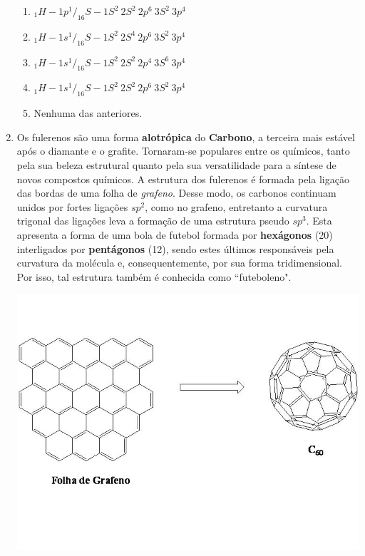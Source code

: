 \documentclass[10pt,a4paper]{article}
\newenvironment{Figure}
  {\par\medskip\noindent\minipage{\linewidth}}
  {\endminipage\par\medskip}
\begin{document}
\begin{multicols}{2}
\begin{enumerate}
		\begin{enumerate}
		\item $ _1H - 1p^1 / _{16}S - 1S^2 \  2S^2 \ 2p^6 \ 3S^2 \ 3p^4$
		\item $ _1H - 1s^1 / _{16}S - 1S^2 \  2S^4 \ 2p^6 \ 3S^2 \ 3p^4$
		\item $ _1H - 1s^1 / _{16}S - 1S^2 \  2S^2 \ 2p^4 \ 3S^6 \ 3p^4$
		\item $ _1H - 1s^1 / _{16}S - 1S^2 \  2S^2 \ 2p^6 \ 3S^2 \ 3p^4$
		\item Nenhuma das anteriores.
		\end{enumerate}

	\item Os fulerenos s\~ao uma forma \textbf{ alotr\'opica} do \textbf{ Carbono}, a terceira mais est\'avel ap\'os o diamante e o grafite. Tornaram-se populares entre os qu\'imicos, tanto pela sua beleza estrutural quanto pela sua versatilidade para a s\'intese de novos compostos qu\'imicos. A estrutura dos fulerenos \'e formada pela liga\c{c}\~ao das bordas de uma folha de \emph{grafeno}. Desse modo, os carbonos continuam unidos por fortes liga\c{c}\~oes $sp^2$, como no grafeno, entretanto a curvatura trigonal das liga\c{c}\~oes leva a forma\c{c}\~ao de uma estrutura pseudo $sp^3$. Esta apresenta a forma de uma bola de futebol formada por \textbf{ hex\'agonos} (20) interligados por \textbf{ pent\'agonos} (12), sendo estes \'ultimos respons\'aveis pela curvatura da mol\'ecula e, consequentemente, por sua forma tridimensional. Por isso, tal estrutura tamb\'em \'e conhecida como ``futeboleno".

\begin{Figure}
     \centering
     \includegraphics[width=\linewidth]{futeboleno_quimica.jpg}
\end{Figure}


\end{enumerate}
\end{multicols}
\end{document}
